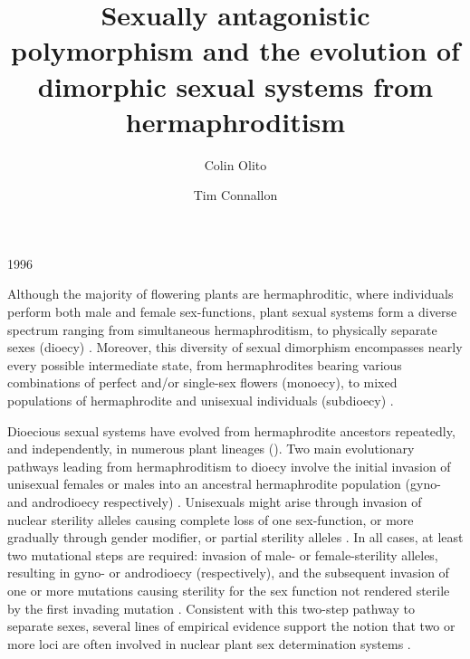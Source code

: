 1996\documentclass[9pt,twocolumn,twoside,lineno]{gsajnl}
\title{Sexually antagonistic polymorphism and the evolution of dimorphic sexual systems from hermaphroditism}
\author[$\ast$,1]{Colin Olito}
\author[$\ast$]{Tim Connallon}
\affil[$\ast$]{Department of Biological Sciences, Monash University, Melbourne, VIC 3800, Australia}
\begin{document}
\maketitle
\thispagestyle{firststyle}
\marginmark
\firstpagefootnote
{}
\vspace{-11pt}%

\lettrine[lines=2]{\color{color2}A}{}lthough the majority of flowering plants are hermaphroditic, where individuals perform both male and female sex-functions, plant sexual systems form a diverse spectrum ranging from simultaneous hermaphroditism, to physically separate sexes (dioecy) \citep{Darwin1877,Westergaard1958,Bachtrog2014}. Moreover, this diversity of sexual dimorphism encompasses nearly every possible intermediate state, from hermaphrodites bearing various combinations of perfect and/or single-sex flowers (monoecy), to mixed populations of hermaphrodite and unisexual individuals (subdioecy) \citep{Bawa1980,SakaiWeller1999}.

Dioecious sexual systems have evolved from hermaphrodite ancestors repeatedly, and independently, in numerous plant lineages (\citealt{Westergaard1958,SakaiWeller1999,Charlesworth2006,Bachtrog2014,Renner2014,GoldbergOtto2017, KaferPannell2017}). Two main evolutionary pathways leading from hermaphroditism to dioecy involve the initial invasion of unisexual females or males into an ancestral hermaphrodite population (gyno- and androdioecy respectively) \citep{Charlesworth1978a,Charlesworth1978b}. Unisexuals might arise through invasion of nuclear sterility alleles causing complete loss of one sex-function, or more gradually through gender modifier, or partial sterility alleles \citep{Charlesworth1978a,Charlesworth1978b,Charlesworth1999}. In all cases, at least two mutational steps are required: invasion of male- or female-sterility alleles, resulting in gyno- or androdioecy (respectively), and the subsequent invasion of one or more mutations causing sterility for the sex function not rendered sterile by the first invading mutation \citep{Westergaard1958,Charlesworth1978a,Charlesworth1978b,Charlesworth2006,Charlesworth2009,KaferPannell2017}. Consistent with this two-step pathway to separate sexes, several lines of empirical evidence support the notion that two or more loci are often involved in nuclear plant sex determination systems \citep{Westergaard1958,Charlesworth2002,Charlesworth2006,Renner2014,Ashman2015}.
\end{document}
